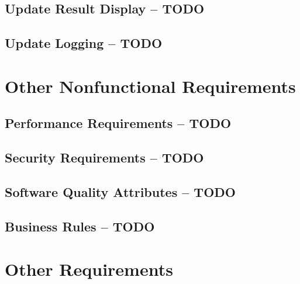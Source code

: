 \documentclass{scrreprt}
\begin{document}
\section{Update Result Display -- TODO}

\section{Update Logging -- TODO}


\chapter{Other Nonfunctional Requirements}

\section{Performance Requirements -- TODO}

\section{Security Requirements -- TODO}

\section{Software Quality Attributes -- TODO}

\section{Business Rules -- TODO}

\chapter{Other Requirements}
\end{document}
